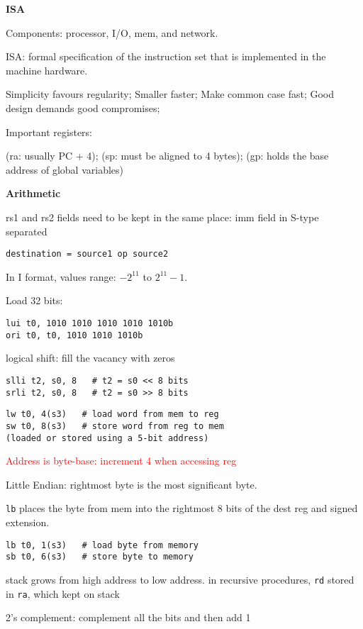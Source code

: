 \documentclass[10pt,landscape,a4paper]{article}
\begin{document}
\begin{multicols}{3}
\textbf{ISA}

Components: processor, I/O, mem, and network.

ISA: formal specification of the instruction set that is implemented in the machine hardware. 

Simplicity favours regularity; Smaller faster; Make common case fast; Good design demands good compromises; 

Important registers: 

(ra: usually PC + 4); (sp: must be aligned to 4 bytes); (gp: holds the base address of global variables)

\textbf{Arithmetic}

rs1 and rs2 fields need to be kept in the same place: imm field in S-type separated
\begin{verbatim}
destination = source1 op source2
\end{verbatim}
In I format, values range: \(-2^{11}\) to \(2^{11} - 1\). 

Load 32 bits:
\begin{verbatim}
lui t0, 1010 1010 1010 1010 1010b
ori t0, t0, 1010 1010 1010b
\end{verbatim}

logical shift: fill the vacancy with zeros
\begin{verbatim}
slli t2, s0, 8   # t2 = s0 << 8 bits
srli t2, s0, 8   # t2 = s0 >> 8 bits
\end{verbatim}
\begin{verbatim}
lw t0, 4(s3)   # load word from mem to reg
sw t0, 8(s3)   # store word from reg to mem
(loaded or stored using a 5-bit address)
\end{verbatim}

\textcolor{red}{Address is byte-base: increment 4 when accessing reg}

Little Endian: rightmost byte is the most significant byte.

\verb|lb| places the byte from mem into the rightmost 8 bits of the dest reg and signed extension.
\begin{verbatim}
lb t0, 1(s3)   # load byte from memory
sb t0, 6(s3)   # store byte to memory
\end{verbatim}

stack grows from high address to low address. in recursive procedures, \verb|rd| stored in \verb|ra|, which kept on stack

2's complement: complement all the bits and then add 1


\end{multicols}
\end{document}
